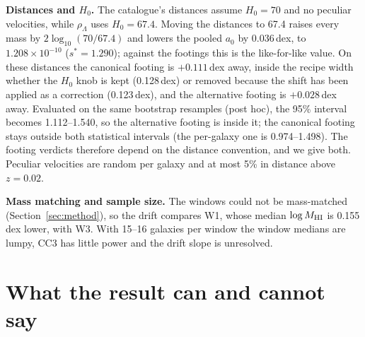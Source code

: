 \documentclass[10pt]{article}
\begin{document}
\textbf{Distances and $H_0$.} The catalogue's distances assume $H_0=70$ and no peculiar velocities, while $\rho_\Lambda$ uses $H_0=67.4$. Moving the distances to 67.4 raises every mass by $2\log_{10}(70/67.4)$ and lowers the pooled $a_0$ by 0.036\,dex, to $1.208\times10^{-10}$ ($s^*=1.290$); against the footings this is the like-for-like value. On these distances the canonical footing is $+0.111$\,dex away, inside the recipe width whether the $H_0$ knob is kept (0.128\,dex) or removed because the shift has been applied as a correction (0.123\,dex), and the alternative footing is $+0.028$\,dex away. Evaluated on the same bootstrap resamples (post hoc), the 95\% interval becomes 1.112--1.540, so the alternative footing is inside it; the canonical footing stays outside both statistical intervals (the per-galaxy one is 0.974--1.498). The footing verdicts therefore depend on the distance convention, and we give both. Peculiar velocities are random per galaxy and at most 5\% in distance above $z=0.02$.

\textbf{Mass matching and sample size.} The windows could not be mass-matched (Section~\ref{sec:method}), so the drift compares W1, whose median $\log M_{\rm HI}$ is 0.155\,dex lower, with W3. With 15--16 galaxies per window the window medians are lumpy, CC3 has little power and the drift slope is unresolved.

\section{What the result can and cannot say}\label{sec:say}
\end{document}

